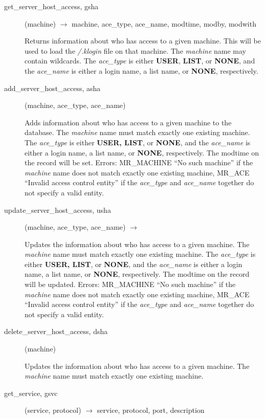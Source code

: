 \documentclass{article}
\begin{document}
\begin{description}

\item[get\_server\_host\_access, gsha](machine) $\rightarrow$ machine,
ace\_type, ace\_name, modtime, modby, modwith

Returns information about who has access to a given machine.  This
will be used to load the {\em /.klogin} file on that machine.  The
{\em machine} name may contain wildcards.  The {\em ace\_type} is either
{\bf USER}, {\bf LIST}, or {\bf NONE}, and the {\em ace\_name} is either a
login name, a list name, or {\bf NONE}, respectively.

\item[add\_server\_host\_access, asha](machine, ace\_type, ace\_name)

Adds information about who has access to a given machine to the
database.  The {\em machine} name must match exactly one existing
machine.  The {\em ace\_type} is either {\bf USER, LIST}, or {\bf NONE}, and
the {\em ace\_name} is either a login name, a list name, or {\bf NONE},
respectively.  The modtime on the record will be set.  Errors:
MR\_MACHINE ``No such machine'' if the {\em machine} name does not match
exactly one existing machine, MR\_ACE ``Invalid access control entity''
if the {\em ace\_type} and {\em ace\_name} together do not specify a valid
entity.

\item[update\_server\_host\_access, usha](machine, ace\_type, ace\_name)
$\rightarrow$

Updates the information about who has access to a given machine.  The
{\em machine} name must match exactly one existing machine.  The
{\em ace\_type} is either {\bf USER, LIST}, or {\bf NONE}, and the
{\em ace\_name} is either a login name, a list name, or {\bf NONE},
respectively.  The modtime on the record will be updated.  Errors:
MR\_MACHINE ``No such machine'' if the {\em machine} name does not match
exactly one existing machine, MR\_ACE ``Invalid access control entity''
if the {\em ace\_type} and {\em ace\_name} together do not specify a valid
entity.

\item[delete\_server\_host\_access, dsha](machine)

Updates the information about who has access to a given machine.  The
{\em machine} name must match exactly one existing machine.

\item[get\_service, gsvc](service, protocol) $\rightarrow$ service, protocol, port, description


\end{description}
\end{document}
